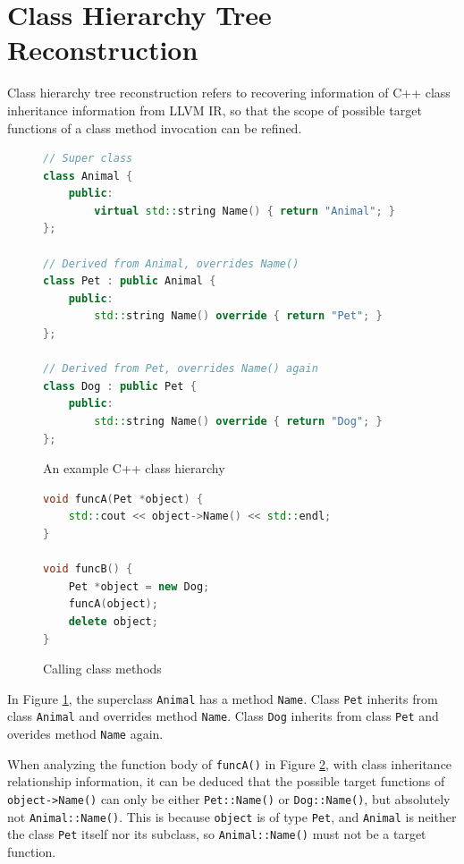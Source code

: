 \newpage

\section{Class Hierarchy Tree Reconstruction}
\label{section:class-tree}

Class hierarchy tree reconstruction refers to recovering information of C++ class inheritance information from LLVM IR, so that the scope of possible target functions of a class method invocation can be refined.

\begin{figure}[H]
    \centering
    \begin{lstlisting}[language=c++]
// Super class
class Animal {
    public:
        virtual std::string Name() { return "Animal"; }
};

// Derived from Animal, overrides Name()
class Pet : public Animal {
    public:
        std::string Name() override { return "Pet"; }
};

// Derived from Pet, overrides Name() again
class Dog : public Pet {
    public:
        std::string Name() override { return "Dog"; }
};
    \end{lstlisting}
    \caption{An example C++ class hierarchy}
    \label{fig:class-hierarchy}
\end{figure}

\begin{figure}[H]
    \centering
    \begin{lstlisting}[language=c++]
void funcA(Pet *object) {
    std::cout << object->Name() << std::endl;
}

void funcB() {
    Pet *object = new Dog;
    funcA(object);
    delete object;
}
    \end{lstlisting}
    \caption{Calling class methods}
    \label{fig:class-caller}
\end{figure}

In Figure \ref{fig:class-hierarchy}, the superclass \texttt{Animal} has a method \texttt{Name}. Class \texttt{Pet} inherits from class \texttt{Animal} and overrides method \texttt{Name}. Class \texttt{Dog} inherits from class \texttt{Pet} and overides method \texttt{Name} again.

When analyzing the function body of \texttt{funcA()} in Figure \ref{fig:class-caller}, with class inheritance relationship information, it can be deduced that the possible target functions of \texttt{object->Name()} can only be either \texttt{Pet::Name()} or \texttt{Dog::Name()}, but absolutely not \texttt{Animal::Name()}. This is because \texttt{object} is of type \texttt{Pet}, and \texttt{Animal} is neither the class \texttt{Pet} itself nor its subclass, so \texttt{Animal::Name()} must not be a target function.

